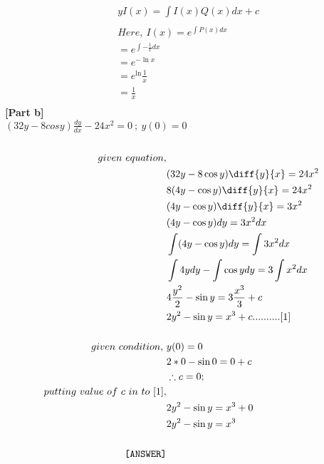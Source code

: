 \documentclass{article}
\newcommand\tab[1][1cm]{\hspace*{#1}}
\begin{document}
\begin{homeworkProblem}
\begin{equation*}
\begin{aligned}
 & y I(x) = \int I(x) Q(x) dx + c\\ \\
  & Here,\ I(x)= e^{\int P(x)dx}\\
  & = e^{\int{-\frac{1}{x}dx}}\\
  &=  e^{-\ln x}\\
  &= e^\ln{\frac{1}{x}}\\
  &= \frac{1}{x}\\
 \end{aligned}
 \end{equation*} 
 \newpage
\textbf{[Part b]}\\ 
\tab $(32y-8cosy) \frac{dy}{dx} - 24x^2 = 0 \ ; \ y(0)=0 $\\
\vspace{5mm}\\
\begin{equation*}
\begin{aligned}
given\ equation,\\
& (32y-8\cos y) \diff{y}{x} = 24x^2\\
& 8 (4y-\cos y) \diff{y}{x} = 24 x^2\\
& (4y-\cos y) \diff{y}{x} = 3x^2\\
& (4y-\cos y) dy = 3 x^2 dx\\
& \int (4y-\cos y) dy = \int 3x^2 dx\\
& \int 4ydy - \int \cos y dy = 3 \int x^2 dx\\
& 4 \frac{y^2}{2} - \sin y = 3 \frac{x^3}{3} + c\\
& 2 y^2 - \sin y = x^3+c..........[1]\\\\
given\ condition,\
& y(0)=0\\
& 2*0-\sin 0 = 0 + c\\
& \therefore c =0;\\
putting\ value\ of\ c\ in\ to\ [1],\\
& 2 y^2 - \sin y = x^3+ 0\\
& 2 y^2 - \sin y = x^3\\
\vspace{3mm}\\
\tab\tab\tab\texttt{[ANSWER]}
\end{aligned}
\end{equation*}
\end{homeworkProblem}
\pagebreak


                
\end{document}
